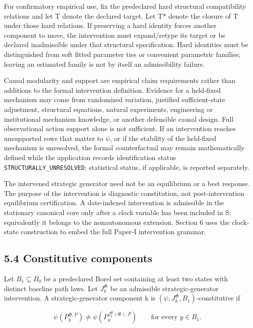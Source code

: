 \documentclass[10pt]{article}
\begin{document}
For confirmatory empirical use, fix the predeclared hard structural
compatibility relations and let T denote the declared target. Let T*
denote the closure of T under those hard relations. If preserving a hard
identity forces another component to move, the intervention must
expand/retype its target or be declared inadmissible under that
structural specification. Hard identities must be distinguished from
soft fitted parameter ties or convenient parametric families; leaving an
estimated family is not by itself an admissibility failure.

Causal modularity and support are empirical claim requirements rather
than additions to the formal intervention definition. Evidence for a
held-fixed mechanism may come from randomized variation, justified
sufficient-state adjustment, structural equations, natural experiments,
engineering or institutional mechanism knowledge, or another defensible
causal design. Full observational action support alone is not
sufficient. If an intervention reaches unsupported rows that matter to
\(\psi\), or if the stability of the held-fixed mechanism is unresolved,
the formal counterfactual may remain mathematically defined while the
application records identification status
\texttt{STRUCTURALLY\_UNRESOLVED}; statistical status, if applicable, is
reported separately.

The intervened strategic generator need not be an equilibrium or a best
response. The purpose of the intervention is diagnostic constitution,
not post-intervention equilibrium certification. A date-indexed
intervention is admissible in the stationary canonical core only after a
clock variable has been included in S; equivalently it belongs to the
nonautonomous extension. Section 6 uses the clock-state construction to
embed the full Paper-I intervention grammar.

\subsection{5.4 Constitutive components}\label{constitutive-components}

Let \(B_1\subseteq{}B_0\) be a predeclared Borel set containing at least
two states with distinct baseline path laws. Let \(J_k^{\mathfrak G}\)
be an admissible strategic-generator intervention. A strategic-generator
component k is \((\psi,J_k^{\mathfrak G},B_1)\)-constitutive if

\begin{equation}
\psi\!\left(P_y^{\mathfrak G,P}\right)\ne \psi\!\left(P_y^{J_k^{\mathfrak G}(\mathfrak G),P}\right)\qquad\text{for every }y\in B_1.
\tag{15}\label{eq:15}
\end{equation}
\end{document}
